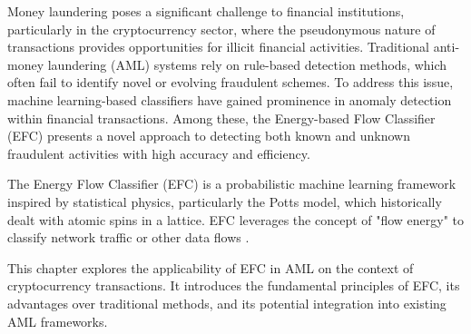 
Money laundering poses a significant challenge to financial institutions, particularly
in the cryptocurrency sector, where the pseudonymous nature of transactions provides
opportunities for illicit financial activities. Traditional anti-money laundering
(AML) systems rely on rule-based detection methods, which often fail to identify
novel or evolving fraudulent schemes. To address this issue, machine learning-based
classifiers have gained prominence in anomaly detection within financial transactions.
Among these, the Energy-based Flow Classifier (EFC) presents a novel approach to
detecting both known and unknown fraudulent activities with high accuracy and efficiency.

The Energy Flow Classifier (EFC) is a probabilistic machine learning framework
inspired by statistical physics, particularly the Potts model, which historically
dealt with atomic spins in a lattice. EFC leverages the concept of "flow energy"
to classify network traffic or other data flows \cite{pontes2021}.

This chapter explores the applicability of EFC in AML on the context of cryptocurrency
transactions. It introduces the fundamental principles of EFC, its advantages over
traditional methods, and its potential integration into existing AML frameworks.






